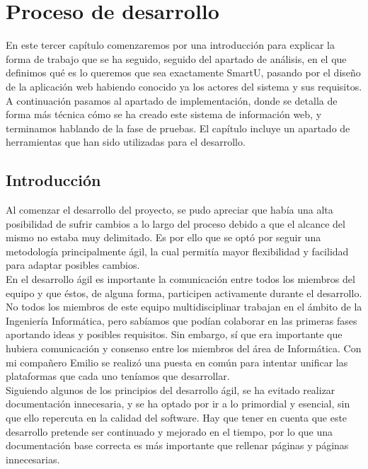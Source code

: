 \chapter{Proceso de desarrollo}
\label{ch:desarrollo}

En este tercer capítulo comenzaremos por una introducción para explicar la forma de trabajo que se ha seguido, seguido del apartado de análisis, en el que definimos qué es lo queremos que sea exactamente SmartU, pasando por el diseño de la aplicación web habiendo conocido ya los actores del sistema y sus requisitos.\\

A continuación pasamos al apartado de implementación, donde se detalla de forma más técnica cómo se ha creado este sistema de información web, y terminamos hablando de la fase de pruebas. El capítulo incluye un apartado de herramientas que han sido utilizadas para el desarrollo.

\section{Introducción}
Al comenzar el desarrollo del proyecto, se pudo apreciar que había una alta posibilidad de sufrir cambios a lo largo del proceso debido a que el alcance del mismo no estaba muy delimitado. Es por ello que se optó por seguir una metodología principalmente ágil, la cual permitía mayor flexibilidad y facilidad para adaptar posibles cambios.\\

En el desarrollo ágil es importante la comunicación entre todos los miembros del equipo y que éstos, de alguna forma, participen activamente durante el desarrollo. No todos los miembros de este equipo multidisciplinar trabajan en el ámbito de la Ingeniería Informática, pero sabíamos que podían colaborar en las primeras fases aportando ideas y posibles requisitos. Sin embargo, sí que era importante que hubiera comunicación y consenso entre los miembros del área de Informática. Con mi compañero Emilio se realizó una puesta en común para intentar unificar las plataformas que cada uno teníamos que desarrollar.\\

Siguiendo algunos de los principios del desarrollo ágil, se ha evitado realizar documentación innecesaria, y se ha optado por ir a lo primordial y esencial, sin que ello repercuta en la calidad del software. Hay que tener en cuenta que este desarrollo pretende ser continuado y mejorado en el tiempo, por lo que una documentación base correcta es más importante que rellenar páginas y páginas innecesarias.\\

